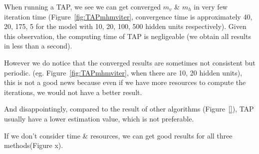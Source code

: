 When running a TAP, we see we can get converged $m_{v}$ \& $m_{h}$ in very few iteration time (Figure~\ref{fig:TAPmhmviter}, convergence time is approximately 40, 20, 175, 5 for the model with 10, 20, 100, 500 hidden units respectively). Given this observation, the computing time of TAP is negligeable (we obtain all results in less than a second). 

However we do notice that the converged results are sometimes not consistent but periodic. (eg. Figure~\ref{fig:TAPmhmviter}, when there are 10, 20 hidden units), this is not a good news because even if we have more resources to compute the iterations, we would not have a better result.

And disappointingly, compared to the result of other algorithms (Figure~\ref{}), TAP usually have a lower estimation value, which is not preferable.







If we don't consider time \& resources, we can get good results for all three methods(Figure x).
